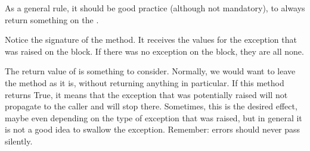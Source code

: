 \documentclass[a4paper,10pt,english]{sphinxmanual}
\begin{document}
\begin{sphinxVerbatim}[commandchars=\\\{\}]
 

     

     

     
         

        

 

 
     
\end{sphinxVerbatim}

As a general rule, it should be good practice (although not mandatory), to always return something on the .

Notice the signature of the  method. It receives the values for the exception that was raised on the block.
If there was no exception on the block, they are all none.

The return value of  is something to consider. Normally, we would want to leave the method as it is, without
returning anything in particular. If this method returns True, it means that the exception that was potentially raised
will not propagate to the caller and will stop there. Sometimes, this is the desired effect, maybe even depending on the
type of exception that was raised, but in general it is not a good idea to swallow the exception. Remember: errors
should never pass silently.
\end{document}
